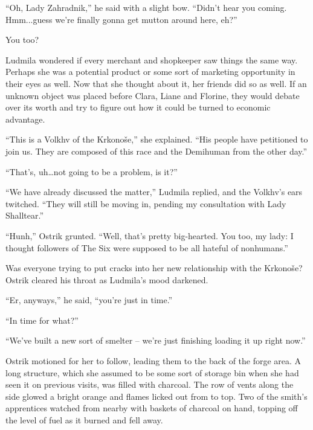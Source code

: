  

“Oh, Lady Zahradnik,” he said with a slight bow. “Didn’t hear you coming. Hmm...guess we’re finally gonna get mutton around here, eh?”

 

You too?

 

Ludmila wondered if every merchant and shopkeeper saw things the same way. Perhaps she was a potential product or some sort of marketing opportunity in their eyes as well. Now that she thought about it, her friends did so as well. If an unknown object was placed before Clara, Liane and Florine, they would debate over its worth and try to figure out how it could be turned to economic advantage.

 

“This is a Volkhv of the Krkonoše,” she explained. “His people have petitioned to join us. They are composed of this race and the Demihuman from the other day.”

 

“That’s, uh…not going to be a problem, is it?”

 

“We have already discussed the matter,” Ludmila replied, and the Volkhv’s ears twitched. “They will still be moving in, pending my consultation with Lady Shalltear.”

 

“Hunh,” Ostrik grunted. “Well, that’s pretty big-hearted. You too, my lady: I thought followers of The Six were supposed to be all hateful of nonhumans.”

 

Was everyone trying to put cracks into her new relationship with the Krkonoše? Ostrik cleared his throat as Ludmila’s mood darkened.

 

“Er, anyways,” he said, “you’re just in time.”

 

“In time for what?”

 

“We’ve built a new sort of smelter – we’re just finishing loading it up right now.”

 

Ostrik motioned for her to follow, leading them to the back of the forge area. A long structure, which she assumed to be some sort of storage bin when she had seen it on previous visits, was filled with charcoal. The row of vents along the side glowed a bright orange and flames licked out from to top. Two of the smith’s apprentices watched from nearby with baskets of charcoal on hand, topping off the level of fuel as it burned and fell away.

